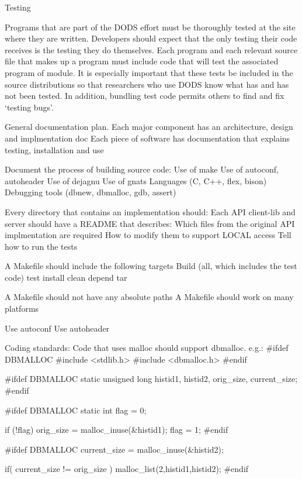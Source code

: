 \begin{description}
\item{Testing}

  Programs that are part of the DODS effort must be thoroughly tested at the
  site where they are written. Developers should expect that the only testing
  their code receives is the testing they do themselves.  Each program and
  each relevant source file that makes up a program must include code that
  will test the associated program of module. It is especially important that
  these tests be included in the source distributions so that researchers who
  use DODS know what has and has not been tested. In addition, bundling test
  code permits others to find and fix `testing bugs'.

\end{description}

General documentation plan.
     Each major component has an architecture, design and implmentation doc
     Each piece of software has documentation that explains testing,
     installation and use

Document the process of building source code:
     Use of make
     Use of autoconf, autoheader
     Use of dejagnu
     Use of gnats
     Languages (C, C++, flex, bison)
     Debugging tools (dbnew, dbmalloc, gdb, assert)

Every directory that contains an implementation should:
Each API client-lib and server should have a README that describes:
     Which files from the original API implmentation are required
     How to modify them to support LOCAL access
     Tell how to run the tests

A Makefile should include the following targets
     Build (all, which includes the test code)
     test
     install
     clean
     depend
     tar

A Makefile should not have any absolute paths
A Makefile should work on many platforms

Use autoconf
Use autoheader

Coding standards:
Code that uses malloc should support dbmalloc. e.g.:
#ifdef DBMALLOC
#include <stdlib.h>
#include <dbmalloc.h>
#endif

#ifdef DBMALLOC
static unsigned long  histid1, histid2, orig_size, current_size;
#endif

#ifdef DBMALLOC
    static int flag = 0;

    if (!flag) {
        orig_size = malloc_inuse(&histid1);
        flag = 1;
    }
#endif

#ifdef DBMALLOC
    current_size = malloc_inuse(&histid2);

    if( current_size != orig_size )
    {
        malloc_list(2,histid1,histid2);
    }
#endif  

